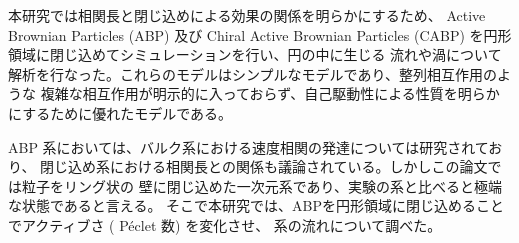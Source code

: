 \documentclass[/Users/ikedahajime/GitHub/reserch/master_report/thesis]{subfiles}
\begin{document}
本研究では相関長と閉じ込めによる効果の関係を明らかにするため、
Active Brownian Particles (ABP) 及び Chiral Active Brownian Particles (CABP)
を円形領域に閉じ込めてシミュレーションを行い、円の中に生じる
流れや渦について解析を行なった。これらのモデルはシンプルなモデルであり、整列相互作用のような
複雑な相互作用が明示的に入っておらず、自己駆動性による性質を明らかにするために優れたモデルである。


ABP 系においては、バルク系における速度相関の発達については研究されており\cite{szamelLongrangedVelocityCorrelations2021,kurodaAnomalousFluctuationsHomogeneous2023}、
閉じ込め系における相関長との関係も議論されている\cite{capriniCollectiveEffectsConfined2021}。しかしこの論文では粒子をリング状の
壁に閉じ込めた一次元系であり、実験の系と比べると極端な状態であると言える。
そこで本研究では、ABPを円形領域に閉じ込めることでアクティブさ ( Péclet 数) を変化させ、
系の流れについて調べた。
\end{document}
